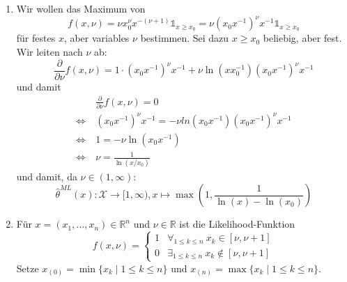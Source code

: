 \documentclass[a4paper]{article}
\begin{document}
\subsection{}

\subsection{}

\begin{enumerate}
    \item Wir wollen das Maximum von 
    \begin{equation*}
        f(x, \nu) = \nu x_0^\nu x^{-(\nu + 1)} \mathds{1}_{x \geq x_0} = \nu (x_0 x^{-1})^\nu x^{-1} \mathds{1}_{x \geq x_0} 
    \end{equation*}
    für festes $x$, aber variables $\nu$ bestimmen. Sei dazu $x \geq x_0$ beliebig, aber fest.
    Wir leiten nach $\nu$ ab:
    \begin{equation*}
        \frac{\partial}{\partial \nu} f(x, \nu) = 1 \cdot (x_0 x^{-1})^\nu x^{-1} + \nu \ln(x x_0^{-1}) (x_0 x^{-1})^\nu x^{-1}
    \end{equation*}
    und damit 
    \begin{align*}
        &\frac{\partial}{\partial \nu} f(x, \nu) = 0 \\
        \iff \ & (x_0 x^{-1})^\nu x^{-1} = - \nu ln(x_0 x^{-1}) (x_0 x^{-1})^\nu x^{-1} \\
        \iff \ & 1 = - \nu \ln (x_0 x^{-1}) \\
        \iff \ & \nu = \frac{1}{\ln(x / x_0)}
    \end{align*}
    und damit, da $\nu \in (1, \infty)$:
    \begin{equation*}
        \hat{\theta}^{ML} (x): \mathcal{X} \to [1, \infty), x \mapsto \max \left(1, \frac{1}{\ln(x) - \ln(x_0)}\right)
    \end{equation*}
    \item Für $x = (x_1, \dots, x_n) \in \mathds{R}^n$ und $\nu \in \mathds{R}$ ist die Likelihood-Funktion
    \begin{equation*}
        f(x, \nu) = \left\{ \begin{matrix}
            1 & \forall_{1 \leq k \leq n} \ x_k \in [\nu, \nu+1] \\
            0 & \exists_{1 \leq k \leq n} \ x_k \notin [\nu, \nu+1]
        \end{matrix} \right.
    \end{equation*}
    Setze $x_{(0)} = \min\{x_k \mid 1 \leq k \leq n\}$ und $x_{(n)} = \max\{x_k \mid 1 \leq k \leq n\}$.


\end{enumerate}
\end{document}
